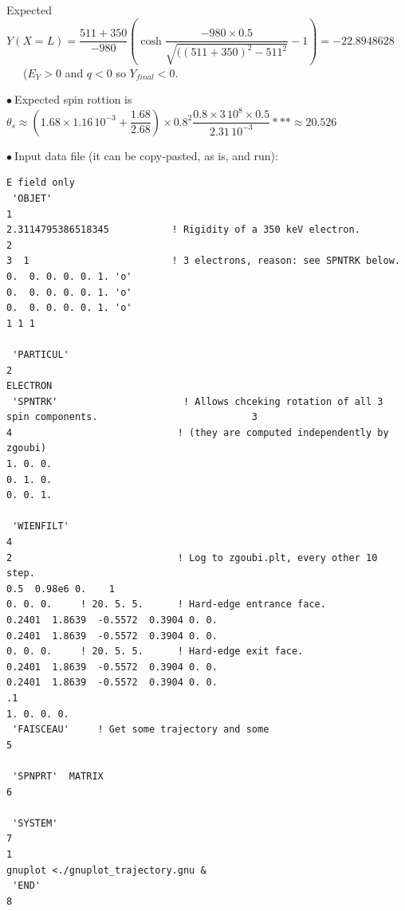 \documentclass[10pt]{article}
\newcommand{\nib}{\noindent \ensuremath{\bullet~}}
\begin{document}
   Expected $Y(X=L)= \dfrac{511+350}{-980} \left( \cosh\dfrac{-980 \times 0.5}{\sqrt{((511+350)^2-511^2}} -1\right)= -22.8948628$ \ \ \ ($E_Y>0$ and $q<0$    so $Y_{final} <0$.

   \nib Expected spin rottion is $ \theta_s \approx (1.68\times1.16\, 10^{-3} +\dfrac{1.68}{2.68})\times 0.8^2 \dfrac{0.8\times 3\,10^8\times 0.5}{2.31\, 10^{-3}} *** \approx 20.526$

   \bigskip

\nib   Input data file (it can be copy-pasted, as is, and run):

{\tiny
\begin{verbatim}
E field only
 'OBJET'                                                                                                      1
2.3114795386518345           ! Rigidity of a 350 keV electron.
2
3  1                         ! 3 electrons, reason: see SPNTRK below.
0.  0. 0. 0. 0. 1. 'o'
0.  0. 0. 0. 0. 1. 'o'
0.  0. 0. 0. 0. 1. 'o'
1 1 1
 
 'PARTICUL'                                                                                                   2
ELECTRON
 'SPNTRK'                      ! Allows chceking rotation of all 3 spin components.                           3
4                             ! (they are computed independently by zgoubi)
1. 0. 0.
0. 1. 0.
0. 0. 1.
 
 'WIENFILT'                                                                                                   4
2                             ! Log to zgoubi.plt, every other 10 step.
0.5  0.98e6 0.    1
0. 0. 0.     ! 20. 5. 5.      ! Hard-edge entrance face.
0.2401  1.8639  -0.5572  0.3904 0. 0.
0.2401  1.8639  -0.5572  0.3904 0. 0.
0. 0. 0.     ! 20. 5. 5.      ! Hard-edge exit face.
0.2401  1.8639  -0.5572  0.3904 0. 0.
0.2401  1.8639  -0.5572  0.3904 0. 0.
.1
1. 0. 0. 0.
 'FAISCEAU'     ! Get some trajectory and some                                                                5
 
 'SPNPRT'  MATRIX                                                                                             6
 
 'SYSTEM'                                                                                                     7
1
gnuplot <./gnuplot_trajectory.gnu &
 'END'                                                                                                        8
\end{verbatim}
}

\bigskip
\end{document}
